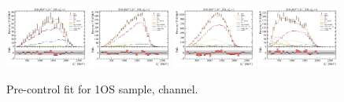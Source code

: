 \begin{figure}[htb]
    \includegraphics[width=0.24\textwidth]{./figs-supplemental-plots/pre-ctrl-fit/lines_q2_slices/fit_result-lines_q2_idx1-Dst-1os-el.pdf}
    \includegraphics[width=0.24\textwidth]{./figs-supplemental-plots/pre-ctrl-fit/lines_q2_slices/fit_result-lines_q2_idx2-Dst-1os-el.pdf}
    \includegraphics[width=0.24\textwidth]{./figs-supplemental-plots/pre-ctrl-fit/lines_q2_slices/fit_result-lines_q2_idx3-Dst-1os-el.pdf}
    \includegraphics[width=0.24\textwidth]{./figs-supplemental-plots/pre-ctrl-fit/lines_q2_slices/fit_result-lines_q2_idx4-Dst-1os-el.pdf}

    \caption{Pre-control fit for 1OS sample, \Dstar channel.}
    \label{fig:pre-ctrl-1os-dst}
\end{figure}

